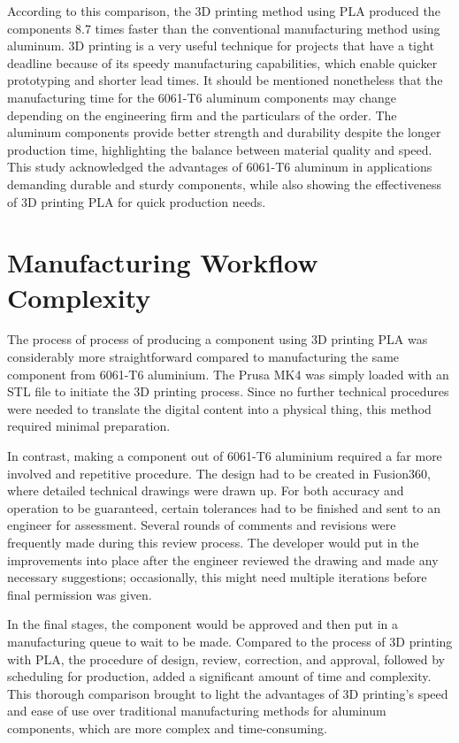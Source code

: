     According to this comparison, the 3D printing method using PLA produced the components 8.7 times
    faster than the conventional manufacturing method using aluminum. 3D printing is a very useful
    technique for projects that have a tight deadline because of its speedy manufacturing capabilities, which
    enable quicker prototyping and shorter lead times. It should be mentioned nonetheless that the
    manufacturing time for the 6061-T6 aluminum components may change depending on the engineering
    firm and the particulars of the order. The aluminum components provide better strength and durability
    despite the longer production time, highlighting the balance between material quality and speed. This
    study acknowledged the advantages of 6061-T6 aluminum in applications demanding durable and sturdy
    components, while also showing the effectiveness of 3D printing PLA for quick production needs.

\section{Manufacturing Workflow Complexity}

    The process of process of producing a component using 3D printing PLA was considerably more
    straightforward compared to manufacturing the same component from 6061-T6 aluminium. The Prusa
    MK4 was simply loaded with an STL file to initiate the 3D printing process. Since no further technical
    procedures were needed to translate the digital content into a physical thing, this method required
    minimal preparation.

    In contrast, making a component out of 6061-T6 aluminium required a far more involved and repetitive
    procedure. The design had to be created in Fusion360, where detailed technical drawings were drawn up.
    For both accuracy and operation to be guaranteed, certain tolerances had to be finished and sent to an
    engineer for assessment. Several rounds of comments and revisions were frequently made during this
    review process. The developer would put in the improvements into place after the engineer reviewed the
    drawing and made any necessary suggestions; occasionally, this might need multiple iterations before
    final permission was given.

    In the final stages, the component would be approved and then put in a manufacturing queue to wait to
    be made. Compared to the process of 3D printing with PLA, the procedure of design, review, correction,
    and approval, followed by scheduling for production, added a significant amount of time and complexity.
    This thorough comparison brought to light the advantages of 3D printing’s speed and ease of use over
    traditional manufacturing methods for aluminum components, which are more complex and time-consuming.

